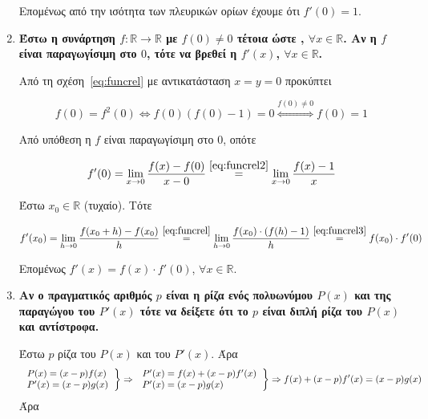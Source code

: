 \begin{enumerate}
\begin{solution}
		Επομένως από την ισότητα των πλευρικών ορίων έχουμε ότι $ f'(0) = 1 $.
    
  \end{solution}
		  

	\item {\bfseries \boldmath Έστω η συνάρτηση $ f \colon \mathbb{R} \to \mathbb{R} $ με $ f(0)
		\neq 0	$ τέτοια ώστε , $ \forall x \in \mathbb{R} $.
		Αν η $f$ είναι παραγωγίσιμη στο $0$, τότε να βρεθεί η $
	f'(x) $, $ \forall x \in \mathbb{R} $.}


  \begin{solution}

		Από τη σχέση~\eqref{eq:funcrel} με αντικατάσταση $ x=y=0 $ προκύπτει
		
		\begin{equation}\label{eq:funcrel2}
			f(0) = f^{2}(0) \Leftrightarrow f(0)(f(0) - 1) = 0 \overset{f(0)\neq
			0}{\Leftrightarrow} f(0) = 1	
		\end{equation}

		Από υπόθεση η $f$ είναι παραγωγίσιμη στο 0, οπότε

		\begin{equation}\label{eq:funcrel3}
			f'(0) = \lim_{x\to 0} \frac{f(x) - f(0)}{x - 0}
			\overset{\eqref{eq:funcrel2}}{=} \lim_{x\to 0}
			\frac{f(x) - 1}{x} 	
		\end{equation}

		Έστω $ x_{0} \in \mathbb{R} $ (τυχαίο). Τότε

		\[
			f'(x_{0}) = \lim_{h\to 0} \frac{f(x_{0} + h) -
			f(x_{0})}{h}	\overset{\eqref{eq:funcrel}}{=} \lim_{h\to 0} \frac{f(x_{0})\cdot
		(f(h) - 1)}{h} \overset{\eqref{eq:funcrel3}}{=} f(x_{0})\cdot f'(0)
		\]

		Επομένως $ f'(x) = f(x)\cdot f'(0)$, $ \forall x \in \mathbb{R}
		$.
    
  \end{solution}

	\item {\bfseries \boldmath Αν ο πραγματικός αριθμός $p$ είναι η ρίζα ενός πολυωνύμου $ P(x)
		$ και της παραγώγου του $ P'(x) $ τότε να δείξετε ότι το $p$ είναι διπλή
	ρίζα του $ P(x) $ και αντίστροφα.}

		
  \begin{solution}

		Έστω $p$ ρίζα του $ P(x) $ και του $ P'(x) $. Άρα
		\[
			\left.
				\begin{tabular}{l}
			$P(x) = (x-p)f(x)$ \\
			$P'(x) = (x-p)g(x)$
				\end{tabular}
			\right\}\Rightarrow 
			\left.
				\begin{tabular}{l}
			$P'(x) = f(x) + (x-p)f'(x)$ \\
			$P'(x) = (x-p)g(x)$
				\end{tabular}
			\right\}\Rightarrow
			f(x) + (x-p)f'(x) = (x-p)g(x) 
			\]
			Άρα  


\end{solution}
\end{enumerate}
